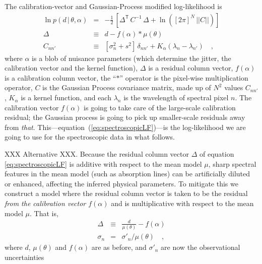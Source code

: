 \documentclass[iop,numberedappendix]{emulateapj}
\newcommand{\transpose}[1]{{#1}^{\!\mathsf T}}
\newcommand{\given}{\,|\,}
\renewcommand{\det}[1]{||{#1}||}
\begin{document}
The calibration-vector and Gaussian-Process modified log-likelihood is
\begin{eqnarray}\label{eq:spectroscopicLF}
\ln p(d\given\theta,\alpha) &=& -\frac{1}{2}\,\left[\transpose{\Delta}\,C^{-1}\,\Delta + \ln([2\pi]^N\,\det{C}) \right]
\\
\Delta &\equiv& d - f(\alpha)\ast\mu(\theta)
\\
C_{nn'} &\equiv& [\sigma_n^2 + s^2]\,\delta_{nn'} + K_\alpha(\lambda_n - \lambda_{n'})
\quad ,
\end{eqnarray}
where $\alpha$ is a blob of nuisance parameters
(which determine the jitter, the calibration vector and the kernel function),
$\Delta$ is a residual column vector,
$f(\alpha)$ is a calibration column vector,
the ``$\ast$'' operator is the pixel-wise multiplication operator,
$C$ is the Gaussian Process covariance matrix,
made up of $N^2$ values $C_{nn'}$,
$K_\alpha$ is a kernel function,
and each $\lambda_n$ is the wavelength of spectral pixel $n$.
The calibration vector $f(\alpha)$ is going to take care of the
large-scale calibration residual; the Gaussian process is going to
pick up smaller-scale residuals away from \emph{that}.
This---equation~(\ref{eq:spectroscopicLF})---is the log-likelihood we
are going to use for the spectroscopic data in what follows.

XXX Alternative XXX.
Because the residual column vector $\Delta$ of equation
\ref{eq:spectroscopicLF} is additive with respect to the mean model
$\mu$, sharp spectral features in the mean model (such as absorption
lines) can be artificially
diluted or enhanced, affecting the inferred physical parameters. To mitigate this we construct a
model where the residual column vector is taken to be the residual
\emph{from the calibration vector $f(\alpha)$} and is multiplicative
with respect to the mean model $\mu$.  That is,
\begin{eqnarray}\label{eq:spectroscopicLFalt} \Delta &\equiv&
\frac{d}{\mu(\theta)} - f(\alpha) \\
\sigma_{n} & = & \sigma'_n / \mu(\theta)
\quad ,
\end{eqnarray}
where $d$, $\mu(\theta)$ and $f(\alpha)$ are as before, and
$\sigma'_{n}$ are now the observational uncertainties
\end{document}
